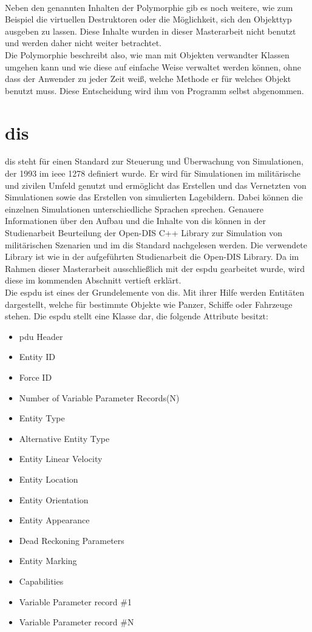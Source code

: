 \\
Neben den genannten Inhalten der Polymorphie gib es noch weitere, wie zum Beispiel die virtuellen Destruktoren oder die Möglichkeit, sich den Objekttyp ausgeben zu lassen. Diese Inhalte wurden in dieser Masterarbeit nicht benutzt und werden daher nicht weiter betrachtet.
\\
Die Polymorphie beschreibt also, wie man mit Objekten verwandter Klassen umgehen kann und wie diese auf einfache Weise verwaltet werden können, ohne dass der Anwender zu jeder Zeit weiß, welche Methode er für welches Objekt benutzt muss. Diese Entscheidung wird ihm von Programm selbst abgenommen. 
\\
\cite{HelmutErlenkotter.}
\cite{Prof.Dr.AlfredIrber.}
\cite{Krau.}

\section{\acl{dis}}
\acf{dis} steht für einen Standard zur Steuerung und Überwachung  von Simulationen, der 1993 im \ac{ieee} 1278 definiert wurde. Er wird für Simulationen im militärische und zivilen Umfeld genutzt und ermöglicht das Erstellen und das Vernetzten von Simulationen sowie das Erstellen von simulierten Lagebildern. Dabei können die einzelnen Simulationen unterschiedliche Sprachen sprechen. Genauere Informationen über den Aufbau und die Inhalte von \ac{dis} können in der Studienarbeit \glqq Beurteilung der Open-DIS C++ Library zur Simulation von militärischen Szenarien\grqq{} und im \ac{dis} Standard nachgelesen werden. Die verwendete Library ist wie in der aufgeführten Studienarbeit die  \glqq Open-DIS\grqq{} Library. Da im Rahmen dieser Masterarbeit ausschließlich mit der \acf{espdu} gearbeitet wurde, wird diese im kommenden Abschnitt vertieft erklärt.\\
Die \ac{espdu} ist eines der Grundelemente von \ac{dis}. Mit ihrer Hilfe werden Entitäten dargestellt, welche für bestimmte Objekte wie Panzer, Schiffe oder Fahrzeuge stehen. Die \ac{espdu} stellt eine Klasse dar, die folgende Attribute besitzt:
\begin{itemize}
	\singlespacing
	\item \ac{pdu} Header
	\item Entity ID
	\item Force ID
	\item Number of Variable Parameter Records(N)
	\item Entity Type
	\item Alternative Entity Type
	\item Entity Linear Velocity
	\item Entity Location
	\item Entity Orientation
	\item Entity Appearance
	\item Dead Reckoning Parameters
	\item Entity Marking
	\item Capabilities
	\item Variable Parameter record \#1
	\item Variable Parameter record \#N
\end{itemize} 


